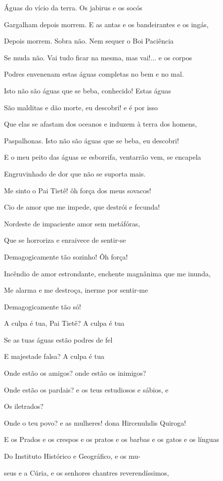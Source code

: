 Águas do vício da terra. Os jabirus e os socós

Gargalham depois morrem. E as antas e os bandeirantes e os ingás,

Depois morrem. Sobra não. Nem sequer o Boi Paciência

Se muda não. Vai tudo ficar na mesma, mas vai!... e os corpos

Podres envenenam estas águas completas no bem e no mal.

Isto não são águas que se beba, conhecido! Estas águas

São malditas e dão morte, eu descobri! e é por isso

Que elas se afastam dos oceanos e induzem à terra dos homens,

Paspalhonas. Isto não são águas que se beba, eu descobri!

E o meu peito das águas se esborrifa, ventarrão vem, se encapela

Engruvinhado de dor que não se suporta mais.

Me sinto o Pai Tietê! ôh força dos meus sovacos!

Cio de amor que me impede, que destrói e fecunda!

Nordeste de impaciente amor sem metáfóras,

Que se horroriza e enraivece de sentir-se

Demagogicamente tão sozinho! Ôh força!

Incêndio de amor estrondante, enchente magnânima que me inunda,

Me alarma e me destroça, inerme por sentir-me

Demagogicamente tão só!

A culpa é tua, Pai Tietê? A culpa é tua

Se as tuas águas estão podres de fel

E majestade falsa? A culpa é tua

Onde estão os amigos? onde estão os inimigos?

Onde estão os pardais? e os teus estudiosos e sábios, e

Os iletrados?

Onde o teu povo? e as mulheres! dona Hircenuhdis Quiroga!

E os Prados e os crespos e os pratos e os barbas e os gatos e os línguas

Do Instituto Histórico e Geográfico, e os mu-

seus e a Cúria, e os senhores chantres reverendíssimos,

